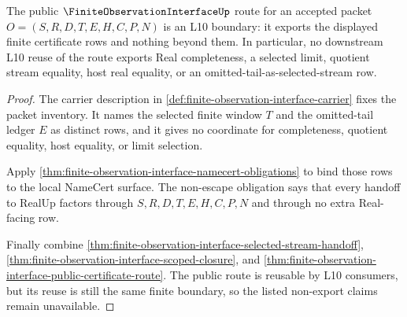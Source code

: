 \begin{theorem}
\label{thm:finite-observation-interface-l10-noescape-public-boundary}
The public $\FiniteObservationInterfaceUp$ route for an accepted packet $O=(S,R,D,T,E,H,C,P,N)$ is an L10 boundary: it exports the displayed finite certificate rows and nothing beyond them. In particular, no downstream L10 reuse of the route exports Real completeness, a selected limit, quotient stream equality, host real equality, or an omitted-tail-as-selected-stream row.
\end{theorem}
\begin{proof}
The carrier description in \autoref{def:finite-observation-interface-carrier} fixes the packet inventory. It names the selected finite window $T$ and the omitted-tail ledger $E$ as distinct rows, and it gives no coordinate for completeness, quotient equality, host equality, or limit selection.

Apply \autoref{thm:finite-observation-interface-namecert-obligations} to bind those rows to the local NameCert surface. The non-escape obligation says that every handoff to RealUp factors through $S,R,D,T,E,H,C,P,N$ and through no extra Real-facing row.

Finally combine \autoref{thm:finite-observation-interface-selected-stream-handoff}, \autoref{thm:finite-observation-interface-scoped-closure}, and \autoref{thm:finite-observation-interface-public-certificate-route}. The public route is reusable by L10 consumers, but its reuse is still the same finite boundary, so the listed non-export claims remain unavailable.
\end{proof}

